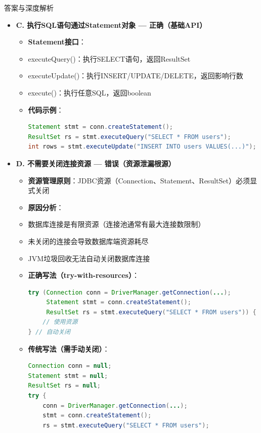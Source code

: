 \documentclass[12pt, a4paper]{ctexart}
\begin{document}
\begin{enumerate}[label=\textbf{\arabic*.}]
\begin{bluebox}{答案与深度解析}
\begin{itemize}[label={}, leftmargin=*, nosep]
		      \item \textbf{C. 执行SQL语句通过Statement对象 — 正确（基础API）}
					  \begin{itemize}[label={}, nosep]
			      \item \textbf{Statement接口}：
				            \item executeQuery()：执行SELECT语句，返回ResultSet
				            \item executeUpdate()：执行INSERT/UPDATE/DELETE，返回影响行数
				            \item execute()：执行任意SQL，返回boolean
			      \item \textbf{代码示例}：
			            \begin{lstlisting}[language=Java]
Statement stmt = conn.createStatement();
ResultSet rs = stmt.executeQuery("SELECT * FROM users");
int rows = stmt.executeUpdate("INSERT INTO users VALUES(...)");
      \end{lstlisting}
					  \end{itemize}
		      \item \textbf{D. 不需要关闭连接资源 — 错误（资源泄漏根源）}
					  \begin{itemize}[label={}, nosep]
			      \item \textbf{资源管理原则}：JDBC资源（Connection、Statement、ResultSet）必须显式关闭
			      \item \textbf{原因分析}：
				            \item 数据库连接是有限资源（连接池通常有最大连接数限制）
				            \item 未关闭的连接会导致数据库端资源耗尽
				            \item JVM垃圾回收无法自动关闭数据库连接
			      \item \textbf{正确写法（try-with-resources）}：
			            \begin{lstlisting}[language=Java]
try (Connection conn = DriverManager.getConnection(...);
     Statement stmt = conn.createStatement();
     ResultSet rs = stmt.executeQuery("SELECT * FROM users")) {
    // 使用资源
} // 自动关闭
      \end{lstlisting}
			      \item \textbf{传统写法（需手动关闭）}：
			            \begin{lstlisting}[language=Java]
Connection conn = null;
Statement stmt = null;
ResultSet rs = null;
try {
    conn = DriverManager.getConnection(...);
    stmt = conn.createStatement();
    rs = stmt.executeQuery("SELECT * FROM users");

\end{lstlisting}
\end{itemize}
\end{itemize}
\end{bluebox}
\end{enumerate}
\end{document}

